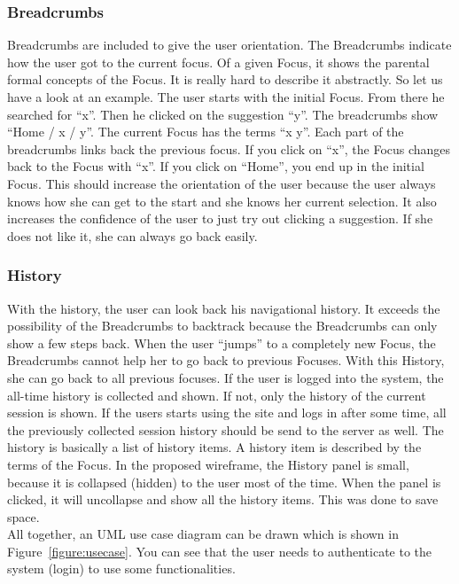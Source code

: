 \documentclass[11pt]{report}
\begin{document}
\subsubsection{Breadcrumbs}

Breadcrumbs are included to give the user orientation. The Breadcrumbs indicate how the user got to the current focus. Of a given Focus, it shows the parental formal concepts of the Focus. It is really hard to describe it abstractly. So let us have a look at an example. The user starts with the initial Focus. From there he searched for ``x''. Then he clicked on the suggestion ``y''. The breadcrumbs show ``Home / x / y''. The current Focus has the terms ``x y''. Each part of the breadcrumbs links back the previous focus. If you click on ``x'', the Focus changes back to the Focus with ``x''. If you click on ``Home'', you end up in the initial Focus. This should increase the orientation of the user because the user always knows how she can get to the start and she knows her current selection. It also increases the confidence of the user to just try out clicking a suggestion. If she does not like it, she can always go back easily. 

\subsubsection{History}

With the history, the user can look back his navigational history. It exceeds the possibility of the Breadcrumbs to backtrack because the Breadcrumbs can only show a few steps back. When the user ``jumps'' to a completely new Focus, the Breadcrumbs cannot help her to go back to previous Focuses. With this History, she can go back to all previous focuses. If the user is logged into the system, the all-time history is collected and shown. If not, only the history of the current \gls{session} is shown. If the users starts using the site and logs in after some time, all the previously collected \gls{session} history should be send to the server as well. The history is basically a list of history items. A history item is described by the terms of the Focus. In the proposed wireframe, the History panel is small, because it is collapsed (hidden) to the user most of the time. When the panel is clicked, it will uncollapse and show all the history items. This was done to save space.\\

All together, an UML use case diagram can be drawn which is shown in Figure~\ref{figure:usecase}. You can see that the user needs to authenticate to the system (login) to use some functionalities.
\end{document}
